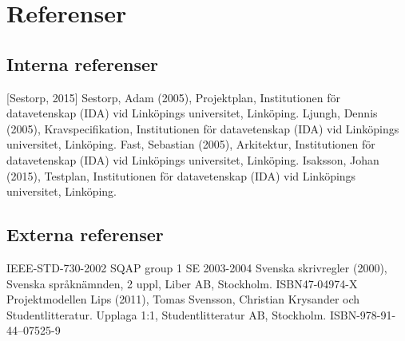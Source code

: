 \section{Referenser}


\subsection{Interna referenser}
[Sestorp, 2015] Sestorp, Adam (2005), Projektplan, Institutionen för datavetenskap
(IDA) vid Linköpings universitet, Linköping.
\newline
\newline
[Ljungh, 2015] Ljungh, Dennis (2005), Kravspecifikation, Institutionen för datavetenskap
(IDA) vid Linköpings universitet, Linköping.
\newline
\newline
[Fast, 2015] Fast, Sebastian (2005), Arkitektur, Institutionen för datavetenskap
(IDA) vid Linköpings universitet, Linköping.
\newline
\newline
[Isaksson, 2015] Isaksson, Johan (2015), Testplan, Institutionen för datavetenskap
(IDA) vid Linköpings universitet, Linköping.

\subsection{Externa referenser}
IEEE-STD-730-2002 SQAP group 1 SE 2003-2004
\newline
\newline
Svenska skrivregler (2000), Svenska språknämnden, 2 uppl, Liber AB, Stockholm. ISBN47-04974-X
\newline
\newline
Projektmodellen Lips (2011), Tomas Svensson, Christian Krysander och Studentlitteratur. Upplaga 1:1, Studentlitteratur AB, Stockholm. ISBN-978-91-44--07525-9